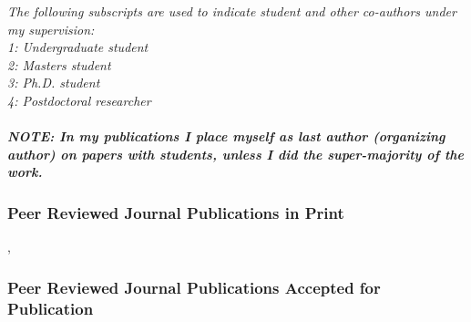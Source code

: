 

\emph{
  The following subscripts are used to indicate student and other co-authors
  under my supervision:\\
  1: Undergraduate student\\
  2:  Masters student\\
  3: Ph.D. student\\
  4: Postdoctoral researcher\\
  \\%
  \textbf{NOTE: In my publications I place myself as last author (organizing
    author) on
    papers with students, unless I did the super-majority of the work.}
}


\subsubsection{Peer Reviewed Journal Publications in Print}
\begin{journalbib}
\item {}, 
\end{journalbib}

\subsubsection{Peer Reviewed Journal Publications Accepted for Publication}

